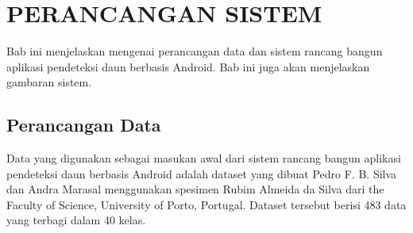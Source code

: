 \chapter{PERANCANGAN SISTEM}

Bab ini menjelaskan mengenai perancangan data dan sistem rancang bangun aplikasi pendeteksi daun berbasis Android. Bab ini juga akan menjelaskan gambaran sistem.

\section{Perancangan Data}
\par Data yang digunakan sebagai masukan awal dari sistem rancang bangun aplikasi pendeteksi daun berbasis Android adalah dataset yang dibuat Pedro F. B. Silva dan Andra Marasal menggunakan spesimen Rubim Almeida da Silva dari the Faculty of Science, University of Porto, Portugal. Dataset tersebut berisi 483 data yang terbagi dalam 40 kelas. 

